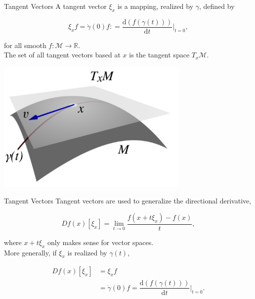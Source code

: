 \documentclass[xcolor=dvipsnames,t]{beamer} %
\newcommand{\reals}{\mathbb{R}}
\newcommand{\drm}{\mathrm{d}}
\newcommand{\defeq}{\mathrel{\mathop:}=}
\begin{document}
\begin{frame}{Tangent Vectors}
   A tangent vector $\xi_x$ is a mapping, realized by $\gamma$, defined by %
   
   \[ \xi_x f = \dot{\gamma}(0)f \defeq \dfrac{\drm(f(\gamma(t)))}{\drm t}\biggr|_{t=0}, \] 
   
   \noindent for all smooth $f:\mathcal{M}\to\reals$.\\

   \noindent The set of all tangent vectors based at $x$ is the tangent space $T_x\mathcal{M}$.  %

   \begin{center}
      \includegraphics[width=0.7\textwidth]{figures/tangent_space.pdf}
   \end{center}
\end{frame}


\begin{frame}{Tangent Vectors}
   Tangent vectors are used to generalize the directional derivative,

   \[ Df(x)[\xi_x] = \lim_{t\to 0} \dfrac{f(x+t\xi_x)-f(x)}{t}, \] 
   
   \noindent where $x+t\xi_x$ only makes sense for vector spaces.\\[.5em]

   \noindent More generally, if $\xi_x$ is realized by $\gamma(t)$,

   \begin{align*} Df(x)[\xi_x] &= \xi_xf\\
                               &= \dot{\gamma}(0)f = \dfrac{\drm(f(\gamma(t)))}{\drm t}\biggr|_{t=0}.
                                 \end{align*}

\end{frame}
\end{document}
